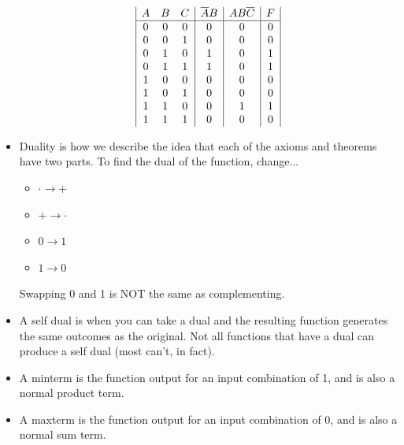 \documentclass[10pt,a4paper]{article}
\begin{document}
\begin{itemize}
\begin{displaymath}
\begin{array}{|c c c|c|c|c|}
A & B & C & \overline{A}B & AB\overline{C} & F\\ 
\hline 
0 & 0 & 0 & 0 & 0 & 0\\
0 & 0 & 1 & 0 & 0 & 0\\
0 & 1 & 0 & 1 & 0 & 1\\
0 & 1 & 1 & 1 & 0 & 1\\
1 & 0 & 0 & 0 & 0 & 0\\
1 & 0 & 1 & 0 & 0 & 0\\
1 & 1 & 0 & 0 & 1 & 1\\
1 & 1 & 1 & 0 & 0 & 0\\
\end{array}
\end{displaymath}
\item Duality is how we describe the idea that each of the axioms and theorems have two parts. To find the dual of the function, change...
\begin{itemize}
\item $\cdot\to+$
\item $+\to\cdot$
\item $0\to1$
\item $1\to0$
\end{itemize}
Swapping 0 and 1 is NOT the same as complementing. 
\item A self dual is when you can take a dual and the resulting function generates the same outcomes as the original. Not all functions that have a dual can produce a self dual (most can't, in fact).
\item A minterm is the function output for an input combination of 1, and is also a normal product term.
\item A maxterm is the function output for an input combination of 0, and is also a normal sum term. 
\end{itemize}\pagebreak
\end{document}
